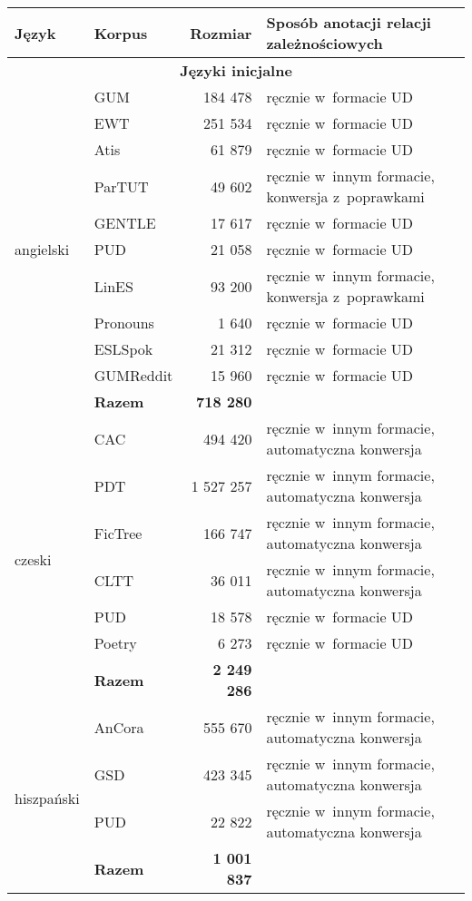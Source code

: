 \begin{table}[!h]
    \centering
    \small
    \begin{tabular}{llrl}
    \toprule
        Język & Korpus & Rozmiar & Sposób anotacji relacji zależnościowych \\ 
    \midrule
    		\multicolumn{4}{c}{\textbf{Języki inicjalne}} \\
    \midrule
    
        \multirow{11}{*}{angielski} & GUM & 184 478 & ręcznie w~formacie UD \\
        ~ & EWT & 251 534 & ręcznie w~formacie UD \\
        ~ & Atis & 61 879 & ręcznie w~formacie UD \\
        ~ & ParTUT & 49 602 & ręcznie w~innym formacie, konwersja z~poprawkami \\
        ~ & GENTLE & 17 617 & ręcznie w~formacie UD \\
        ~ & PUD & 21 058 & ręcznie w~formacie UD \\
        ~ & LinES & 93 200 & ręcznie w~innym formacie, konwersja z~poprawkami \\
        ~ & Pronouns & 1 640 & ręcznie w~formacie UD \\
        ~ & ESLSpok & 21 312 & ręcznie w~formacie UD \\
        ~ & GUMReddit & 15 960 & ręcznie w~formacie UD \\ 
        ~ & \textbf{Razem} & \textbf{718 280} \\ \midrule
        
       	\multirow{7}{*}{czeski} & CAC & 494 420 & ręcznie w~innym formacie, automatyczna konwersja \\ 
        ~ & PDT & 1 527 257 & ręcznie w~innym formacie, automatyczna konwersja \\
        ~ & FicTree & 166 747 & ręcznie w~innym formacie, automatyczna konwersja \\
        ~ & CLTT & 36 011 & ręcznie w~innym formacie, automatyczna konwersja \\
        ~ & PUD & 18 578 & ręcznie w~formacie UD \\
        ~ & Poetry & 6 273 & ręcznie w~formacie UD \\ 
        ~ & \textbf{Razem} & \textbf{2 249 286} \\ \midrule
        
        \multirow{4}{*}{hiszpański} & AnCora & 555 670 & ręcznie w~innym formacie, automatyczna konwersja \\
        ~ & GSD & 423 345 & ręcznie w~innym formacie, automatyczna konwersja \\
        ~ & PUD & 22 822 & ręcznie w~innym formacie, automatyczna konwersja \\ 
        ~ & \textbf{Razem} & \textbf{1 001 837} \\ \midrule


\end{tabular}
\end{table}

